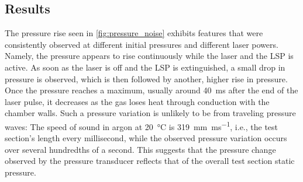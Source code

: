         \subsection{Results}
            The pressure rise seen in \autoref{fig:pressure_noise} exhibits features that were consistently observed at different initial pressures and different laser powers. Namely, the pressure appears to rise continuously while the laser and the LSP is active. As soon as the laser is off and the LSP is extinguished, a small drop in pressure is observed, which is then followed by another, higher rise in pressure. Once the pressure reaches a maximum, usually around \qty{40}{ms} after the end of the laser pulse, it decreases  as the gas loses heat through conduction with the chamber walls. Such a pressure variation is unlikely to be from traveling pressure waves: The speed of sound in argon at \qty{20}{\degreeCelsius} is \qty{319}{mm.ms^{-1}}, i.e., the test section's length every millisecond, while the observed pressure variation occurs over several hundredths of a second. This suggests that the pressure change observed by the pressure transducer reflects that of the overall test section static pressure.



